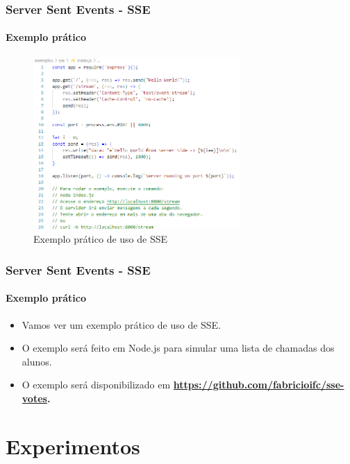 \documentclass[
	9pt, %
	t, %
]{beamer}
\begin{document}
\begin{frame}
	\frametitle{Server Sent Events - SSE}
	\framesubtitle{Exemplo prático}

	\begin{figure}
		\centering
		\includegraphics[width=0.7\textwidth]{sse_example.png}
		\caption{Exemplo prático de uso de SSE}
	\end{figure}

\end{frame}

\begin{frame}
	\frametitle{Server Sent Events - SSE}
	\framesubtitle{Exemplo prático}

	\begin{itemize}
		\item Vamos ver um exemplo prático de uso de SSE.
		\item O exemplo será feito em Node.js para simular uma lista de chamadas dos alunos.
		\item O exemplo será disponibilizado em \textbf{\href{https://github.com/fabricioifc/sse-votes}{https://github.com/fabricioifc/sse-votes}.}
	\end{itemize}

\end{frame}

\section{Experimentos}
\end{document}
